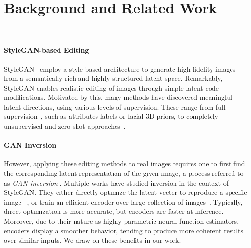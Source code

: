 \section{Background and Related Work}~\label{sec:rw}


\paragraph{StyleGAN-based Editing}

StyleGAN~\cite{karras2019style, karras2020analyzing} employ a style-based architecture to generate high fidelity images from a semantically rich and highly structured latent space. Remarkably, StyleGAN enables realistic editing of images through simple latent code modifications.
Motivated by this, many methods have discovered meaningful latent directions, using various levels of supervision. These range from full-supervision~\cite{shen2020interpreting,abdal2020styleflow,denton2019detecting, goetschalckx2019ganalyze, tewari2020pie, tewari2020stylerig}, such as attributes labels or facial $3$D priors, to completely unsupervised and zero-shot approaches~\cite{harkonen2020ganspace,shen2020closedform,voynov2020unsupervised,wang2021a,patashnik2021styleclip,xia2021tedigan,gal2021stylegannada}.  

\paragraph{GAN Inversion}


However, applying these editing methods to real images requires one to first find the corresponding latent representation of the given image, a process referred to as \textit{GAN inversion} \cite{zhu2016generative,lipton2017precise,creswell2018inverting, yeh2017semantic, xia2021gan}. 
Multiple works have studied inversion in the context of StyleGAN.
They either directly optimize the latent vector to reproduce a specific image ~\cite{abdal2019image2stylegan,abdal2020image2stylegan++,semantic2019bau,zhu2020improved,gu2020image, xu2021continuity, roich2021pivotal}, or train an efficient encoder over large collection of images~\cite{zhu2020domain, pidhorskyi2020adversarial,guan2020collaborative,richardson2020encoding,tov2021designing,alaluf2021restyle,kang2021gan,kim2021exploiting, alaluf2021hyperstyle}. Typically, direct optimization is more accurate, but encoders are faster at inference. Moreover, due to their nature as highly parametric neural function estimators, encoders display a smoother behavior, tending to produce more coherent results over similar inputs. We draw on these benefits in our work.


